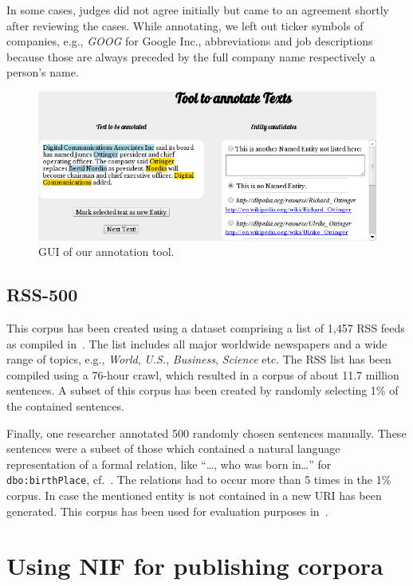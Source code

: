 In some cases, judges did not agree initially but came to an agreement shortly after reviewing the cases.
While annotating, we left out ticker symbols of companies, e.g., \textit{GOOG} for Google Inc., abbreviations and job descriptions because those are always preceded by the full company name respectively a person's name.

\begin{figure}[htb!]
\centering
\includegraphics[width=\linewidth]{part_02/benchmarking/LREC_N3NIFNERNED/qrtool.png}
\caption{GUI of our annotation tool.}
\label{n3:fig:qrtool}
\end{figure}


\subsection{RSS-500}

This corpus has been created using a dataset comprising a list of 1,457 RSS feeds as compiled in~\cite{GOLDHAHN12.327}.
The list includes all major worldwide newspapers and a wide range of topics, e.g., \emph{World}, \emph{U.S.}, \emph{Business}, \emph{Science} etc.
The RSS list has been compiled using a 76-hour crawl, which resulted in a corpus of about 11.7 million sentences.
A subset of this corpus has been created by randomly selecting 1\% of the contained sentences.
 
Finally, one researcher annotated 500 randomly chosen sentences manually.
These sentences were a subset of those which contained a natural language representation of a formal relation, like ``\ldots, who was born in\ldots '' for \texttt{dbo:birthPlace}, cf.~\cite{conf/ekaw/GerberN12}.
The relations had to occur more than 5 times in the 1\% corpus. %
In case the mentioned entity is not contained in a new URI has been generated.
This corpus has been used for evaluation purposes in~\cite{GER+13}.

\section{Using NIF for publishing corpora}
\label{n3:NIF}



